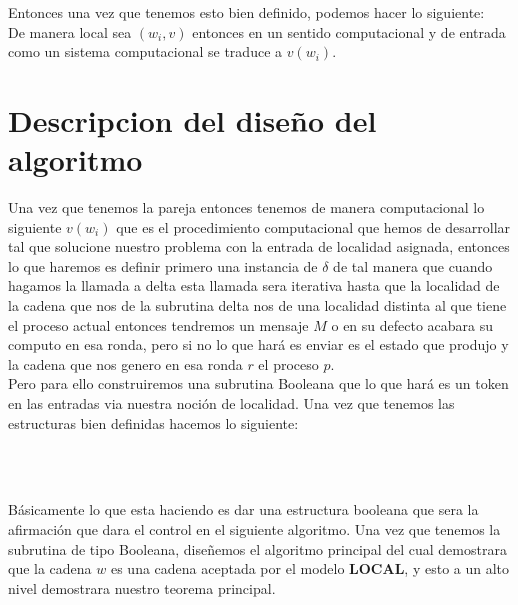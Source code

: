\documentclass[10pt]{article}
\begin{document}
    Entonces una vez que tenemos esto bien definido, podemos hacer lo siguiente:\\
    De manera local sea $(w_{i},v)$ entonces en un sentido computacional y de entrada como un sistema computacional
    se traduce a $v(w_{i})$.
    \section{Descripcion del diseño del algoritmo}\label{sec:descripcion-del-diseño-del-algoritmo}
    Una vez que tenemos la pareja entonces tenemos de manera computacional lo siguiente $v(w_{i})$ que es el
    procedimiento computacional que hemos de desarrollar tal que solucione nuestro problema con la entrada
    de localidad asignada, entonces lo que haremos es definir primero una instancia de $\delta$ de tal manera
    que cuando hagamos la llamada a delta esta llamada sera iterativa hasta que la localidad de la cadena que nos
    de la subrutina delta nos de una localidad distinta al que tiene el proceso actual entonces tendremos un mensaje
    $M$ o en su defecto acabara su computo en esa ronda, pero si no lo que hará es enviar es el estado que produjo
    y la cadena que nos genero en esa ronda $r$ el proceso $p$.\\
    Pero para ello construiremos una subrutina Booleana que lo que hará es un token en las entradas via nuestra noción
    de localidad.
    Una vez que tenemos las estructuras bien definidas hacemos lo siguiente:
    \\
    \begin{algorithm}
        \begin{algorithmic}
             \\
            \ELSE
            \ENDIF
        \end{algorithmic}
        \caption{$Func\char95 Boolean(w_{i},p)$}
    \end{algorithm}
    \\
    \space
    Básicamente lo que esta haciendo es dar una estructura booleana que sera la afirmación
    que dara el control en el siguiente algoritmo.
    Una vez que tenemos la subrutina de tipo Booleana, diseñemos el algoritmo principal del cual demostrara que la cadena $w$ es una
    cadena aceptada por el modelo $\textbf{LOCAL}$, y esto a un alto nivel demostrara nuestro teorema principal.
\end{document}
